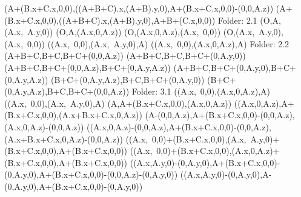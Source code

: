 \left(A+\left(B.x+C.x,0,0\right),\left(\left(A+B+C\right).x,\left(A+B\right).y,0\right),A+\left(B.x+C.x,0,0\right)-\left(0,0,A.z\right)\right)
\left(A+\left(B.x+C.x,0,0\right),\left(\left(A+B+C\right).x,\left(A+B\right).y,0\right),A+B+\left(C.x,0,0\right)\right)
Folder: 2.1
\left(O,A,\left(A.x,\ A.y,0\right)\right)
\left(O,A,\left(A.x,0,A.z\right)\right)
\left(O,\left(A.x,0,A.z\right),\left(A.x,\ 0,0\right)\right)
\left(O,\left(A.x,\ A.y,0\right),\left(A.x,\ 0,0\right)\right)
\left(\left(A.x,\ 0,0\right),\left(A.x,\ A.y,0\right),A\right)
\left(\left(A.x,\ 0,0\right),\left(A.x,0,A.z\right),A\right)
Folder: 2.2
\left(A+B+C,B+C,B+C+\left(0,0,A.z\right)\right)
\left(A+B+C,B+C,B+C+\left(0,A.y,0\right)\right)
\left(A+B+C,B+C+\left(0,0,A.z\right),B+C+\left(0,A.y,A.z\right)\right)
\left(A+B+C,B+C+\left(0,A.y,0\right),B+C+\left(0,A.y,A.z\right)\right)
\left(B+C+\left(0,A.y,A.z\right),B+C,B+C+\left(0,A.y,0\right)\right)
\left(B+C+\left(0,A.y,A.z\right),B+C,B+C+\left(0,0,A.z\right)\right)
Folder: 3.1
\left(\left(A.x,\ 0,0\right),\left(A.x,0,A.z\right),A\right)
\left(\left(A.x,\ 0,0\right),\left(A.x,\ A.y,0\right),A\right)
\left(A,A+\left(B.x+C.x,0,0\right),\left(A.x,0,A.z\right)\right)
\left(\left(A.x,0,A.z\right),A+\left(B.x+C.x,0,0\right),\left(A.x+B.x+C.x,0,A.z\right)\right)
\left(A-\left(0,0,A.z\right),A+\left(B.x+C.x,0,0\right)-\left(0,0,A.z\right),\left(A.x,0,A.z\right)-\left(0,0,A.z\right)\right)
\left(\left(A.x,0,A.z\right)-\left(0,0,A.z\right),A+\left(B.x+C.x,0,0\right)-\left(0,0,A.z\right),\left(A.x+B.x+C.x,0,A.z\right)-\left(0,0,A.z\right)\right)
\left(\left(A.x,\ 0,0\right)+\left(B.x+C.x,0,0\right),\left(A.x,\ A.y,0\right)+\left(B.x+C.x,0,0\right),A+\left(B.x+C.x,0,0\right)\right)
\left(\left(A.x,\ 0,0\right)+\left(B.x+C.x,0,0\right),\left(A.x,0,A.z\right)+\left(B.x+C.x,0,0\right),A+\left(B.x+C.x,0,0\right)\right)
\left(\left(A.x,A.y,0\right)-\left(0,A.y,0\right),A+\left(B.x+C.x,0,0\right)-\left(0,A.y,0\right),A+\left(B.x+C.x,0,0\right)-\left(0,0,A.z\right)-\left(0,A.y,0\right)\right)
\left(\left(A.x,A.y,0\right)-\left(0,A.y,0\right),A-\left(0,A.y,0\right),A+\left(B.x+C.x,0,0\right)-\left(0,A.y,0\right)\right)
